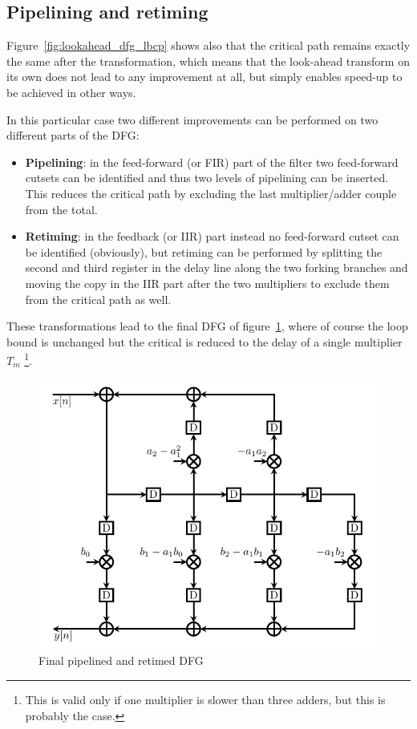\documentclass[a4paper]{article}
\begin{document}
\subsection{Pipelining and retiming}
Figure~\ref{fig:lookahead_dfg_lbcp} shows also that the critical path remains exactly the same after the transformation, which means that the look-ahead transform on its own does not lead to any improvement at all, but simply enables speed-up to be achieved in other ways. 

In this particular case two different improvements can be performed on two different parts of the DFG:
\begin{itemize}
    \item \textbf{Pipelining}: in the feed-forward (or FIR) part of the filter two feed-forward cutsets can be identified and thus two levels of pipelining can be inserted. This reduces the critical path by excluding the last multiplier/adder couple from the total.
    \item \textbf{Retiming}: in the feedback (or IIR) part instead no feed-forward cutset can be identified (obviously), but retiming can be performed by splitting the second and third register in the delay line along the two forking branches and moving the copy in the IIR part after the two multipliers to exclude them from the critical path as well.
\end{itemize}
These transformations lead to the final DFG of figure~\ref{fig:pipelined_dfg}, where of course the loop bound is unchanged but the critical is reduced to the delay of a single multiplier $T_m$ \footnote{This is valid only if one multiplier is slower than three adders, but this is probably the case.}.

\begin{figure}[hbtp]
    \centering
    \includegraphics[width=.9\linewidth]{media/pipelined_lookahead_dfg.pdf}
    \caption{Final pipelined and retimed DFG}
    \label{fig:pipelined_dfg}
\end{figure}
\end{document}
